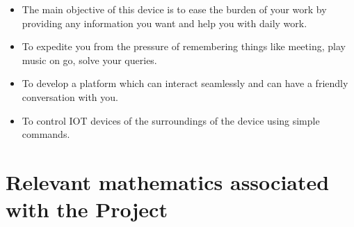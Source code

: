 \documentclass[16pt,oneside,a4paper]{article}
\begin{document}
\begin{itemize}
	\item The main objective of this device is to ease the burden of your work by providing any information you want and help you with daily work.
	\item To expedite you from the pressure of remembering things like meeting, play music on go, solve your queries.
	\item To develop a platform which can interact seamlessly and can have a friendly conversation with you.
	\item To control IOT devices of the surroundings of the device using simple commands.
\end{itemize}

	
\section{Relevant mathematics associated with the Project}
\label{sec:math}
\end{document}
